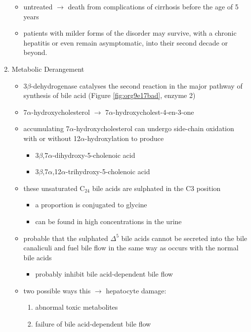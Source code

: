 \documentclass{scrartcl}
\begin{document}
\begin{enumerate}
\begin{itemize}
\item untreated \(\to\) death from complications of cirrhosis before the age
of 5 years
\item patients with milder forms of the disorder may survive, with a
chronic hepatitis or even remain asymptomatic, into their second
decade or beyond.
\end{itemize}
\item Metabolic Derangement
\label{sec:orgfeb0a22}
\begin{itemize}
\item 3\(\beta\)-dehydrogenase catalyses the second reaction in the major
pathway of synthesis of bile acid (Figure \ref{fig:org9e17bad}, enzyme 2)
\item 7\(\alpha\)-hydroxycholesterol \(\to\) 7\(\alpha\)-hydroxycholest-4-en-3-one
\item accumulating 7\(\alpha\)-hydroxycholesterol can undergo side-chain
oxidation with or without 12\(\alpha\)-hydroxylation to produce
\begin{itemize}
\item 3\(\beta\),7\(\alpha\)-dihydroxy-5-cholenoic acid
\item 3\(\beta\),7\(\alpha\),12\(\alpha\)-trihydroxy-5-cholenoic acid
\end{itemize}
\item these unsaturated C\(_{\text{24}}\) bile acids are sulphated in the C3 position
\begin{itemize}
\item a proportion is conjugated to glycine
\item can be found in high concentrations in the urine
\end{itemize}
\item probable that the sulphated \(\Delta^{\text{5}}\) bile acids cannot be secreted
into the bile canaliculi and fuel bile flow in the same way as
occurs with the normal bile acids
\begin{itemize}
\item probably inhibit bile acid-dependent bile flow
\end{itemize}
\item two possible ways this \(\to\) hepatocyte damage:
\begin{enumerate}
\item abnormal toxic metabolites
\item failure of bile acid-dependent bile flow
\end{enumerate}
\end{itemize}


\end{enumerate}
\end{document}
